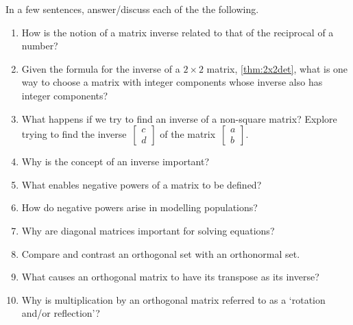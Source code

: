 \begin{exercise} \label{ex:} 
In a few sentences, answer\slash discuss each of the the following.
\begin{enumerate}
\item How is the notion of a matrix inverse related to that of the reciprocal of a number?

\item Given the formula for the inverse of a \(2\times 2\) matrix, \autoref{thm:2x2det}, what is one way to choose a matrix with integer components whose inverse also has integer components?

\item What happens if we try to find an inverse of a non-square matrix?  Explore trying to find the inverse~\(\begin{bmatrix} c\\d \end{bmatrix}\) of the matrix~\(\begin{bmatrix} a\\b \end{bmatrix}\).

\item Why is the concept of an inverse important?

\item What enables negative powers of a matrix to be defined?

\item How do negative powers arise in modelling populations?

\item Why are diagonal matrices important for solving equations?

\item Compare and contrast an orthogonal set with an orthonormal set.

\item What causes an orthogonal matrix to have its transpose as its inverse?

\item Why is multiplication by an orthogonal matrix referred to as a `rotation and/or reflection'?

\end{enumerate}
\end{exercise}

\begin{comment}%
why, what caused X?
how did X occur?
what-if? what-if-not?
how does X compare with Y?
what is the evidence for X?
why is X important?
\end{comment}














